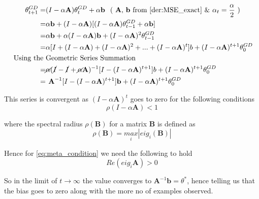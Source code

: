 \documentclass[twoside]{article}
\begin{document}
\begin{equation}
    \begin{split}
        \theta_{t+1}^{GD} =& (I - \alpha \textbf{A})\theta_t^{GD} + \alpha \textbf{b }\text{   ( \textbf{A}, \textbf{b} from \ref{der:MSE_exact} \& $\alpha_t = \dfrac{\alpha}{2}$ )}\\
        =& \alpha \textbf{b} + (I - \alpha \textbf{A})[(I - \alpha \textbf{A})\theta_{t-1}^{GD} + \alpha \textbf{b}]\\
        =& \alpha \textbf{b} + \alpha (I - \alpha \textbf{A}) \textbf{b} + (I - \alpha \textbf{A})^2\theta_{t-1}^{GD}\\
        =& \alpha[I + (I - \alpha \textbf{A}) + (I - \alpha \textbf{A})^2 + ... + (I - \alpha \textbf{A})^t]b + (I - \alpha \textbf{A})^{t+1}\theta_{0}^{GD}\\
        \text{ Using the } & \text{Geometric Series Summation}\\
        =& \cancel{\alpha} (\cancel{I} - \cancel{I} + \cancel{\alpha} \textbf{A} )^{-1}[I - (I - \alpha \textbf{A} )^{t+1}]b + (I - \alpha \textbf{A})^{t+1}\theta_{0}^{GD}\\
        =&\textbf{ A}^{-1}[I - (I - \alpha \textbf{A} )^{t+1}]\textbf{\textbf{b}} + (I - \alpha \textbf{A})^{t+1}\theta_{0}^{GD}\\
    \end{split}
\end{equation}

This series is convergent as $(I - \alpha \textbf{A})^{t}$ goes to zero for the following conditions  
\begin{equation}\label{eq:meta_condition}
    \rho( I - \alpha \textbf{A}) < 1
\end{equation}

where the spectral radius $\rho(\textbf{B})$ for a matrix $\textbf{B}$ is defined as 
\begin{equation}\label{eq:def_spectral}
    \rho(\textbf{B}) = \underset{i}{max}|eig_i(\textbf{B})|
\end{equation}

Hence for \ref{eq:meta_condition} we need the following to hold 
\begin{equation}
    Re({eig}_i \textbf{A}) > 0
\end{equation}

So in the limit of $t\rightarrow \infty$ the value converges to $\textbf{A}^{-1}\textbf{b} = \theta^*$, hence telling us that the bias goes to zero along with the more no of examples observed.
\end{document}
